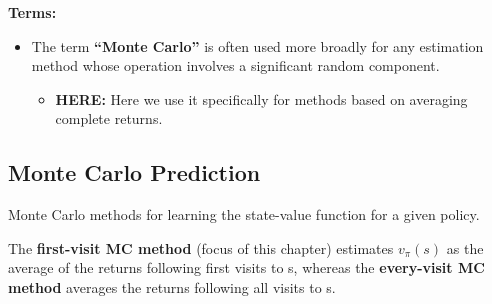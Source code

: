 \documentclass[12pt, a4paper]{article}
\begin{document}
\textbf{Terms:}

\begin{itemize}
\item
  The term \textbf{``Monte Carlo''} is often used more broadly for any
  estimation method whose operation involves a significant random
  component.

  \begin{itemize}
  \item
    \textbf{HERE:} Here we use it specifically for methods based on
    averaging complete returns.
  \end{itemize}
\end{itemize}






\subsection{Monte Carlo Prediction}\label{monte-carlo-prediction}

Monte Carlo methods for learning the state-value function for a given
policy.

The \textbf{first-visit MC method} (focus of this chapter) estimates
\(v_\pi(s)\) as the average of the returns following first visits to s,
whereas the \textbf{every-visit MC method} averages the returns
following all visits to s.
\end{document}
